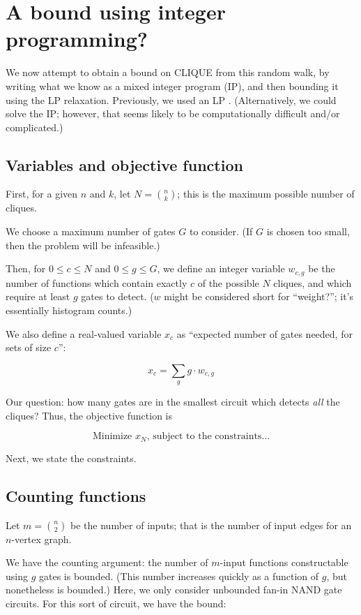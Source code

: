 \documentclass[12pt]{article}
\theoremstyle{definition}
\begin{document}
\section{A bound using integer programming?}

We now attempt to obtain a bound on CLIQUE from this random walk, by
writing what we know as a mixed integer program (IP), and then bounding it
using the LP relaxation. Previously, we used an LP \cite{buggyclique}.
(Alternatively, we could solve the IP; however, that seems likely to
be computationally difficult and/or complicated.)

\subsection{Variables and objective function}

First, for a given $n$ and $k$, let $N = {n \choose k}$; this is
the maximum possible number of cliques.

We choose a maximum number of gates $G$ to consider. (If $G$ is
chosen too small, then the problem will be infeasible.)

Then, for $0 \le c \le N$ and $0 \le g \le G$,
we define an integer variable $w_{c,g}$ be the number of functions which contain
exactly $c$ of the possible $N$ cliques, and which require at least
$g$ gates to detect. ($w$ might be considered short for ``weight?'';
it's essentially histogram counts.)

We also define a real-valued variable
$x_c$ as ``expected number of gates needed, for sets of size $c$'':

\[
x_c = \sum_g g \cdot w_{c,g}
\]

Our question: how many gates are in the smallest circuit
which detects {\em all} the cliques? Thus, the objective function
is

\[
\text{Minimize }x_N\text{, subject to the constraints...}
\]

Next, we state the constraints.

\subsection{Counting functions}

Let $m = {n \choose 2}$ be the number of inputs; that is the number
of input edges for an $n$-vertex graph.

We have the counting argument: the number of $m$-input functions
constructable using $g$ gates is bounded. (This number increases
quickly as a function of $g$, but nonetheless is bounded.)
Here, we only consider unbounded fan-in NAND gate circuits. For
this sort of circuit, we have the bound:
\end{document}
